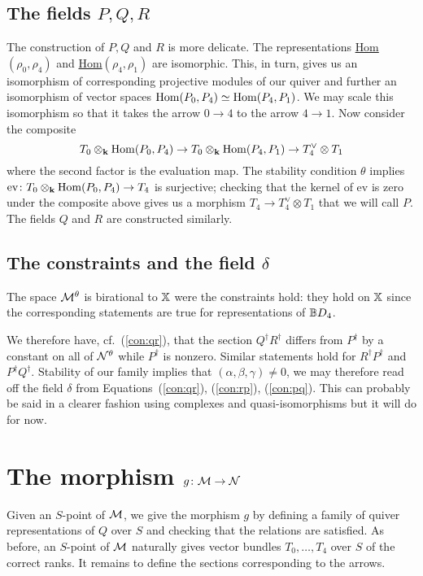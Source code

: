 \documentclass{amsart}
\theoremstyle{definition}
\begin{document}
\subsection{The fields $P, Q, R$}

The construction of $P,Q$ and $R$ is more delicate.
The representations \underline{Hom}$(\rho_0, \rho_4)$ and \underline{Hom}$(\rho_4, \rho_1)$ are isomorphic.
This, in turn, gives us an isomorphism of corresponding projective modules of our quiver and further an isomorphism of vector spaces $\operatorname{Hom}(P_0, P_4) \simeq \operatorname{Hom}(P_4, P_1)$.
We may scale this isomorphism so that it takes the arrow $0 \rightarrow 4$ to the arrow $4 \rightarrow 1$.
Now consider the composite $$T_0 \otimes_{\mathbf{k}} \operatorname{Hom}(P_0, P_4) \rightarrow T_0 \otimes_{\mathbf{k}} \operatorname{Hom}(P_4, P_1) \rightarrow T_4^\vee \otimes T_1$$ where the second factor is the evaluation map.
The stability condition $\theta$ implies $\text{ev} \colon T_0 \otimes_{\mathbf{k}} \operatorname{Hom}(P_0, P_4) \rightarrow T_4$ is surjective; checking that the kernel of ev is zero under the composite above gives us a morphism $T_4 \rightarrow T_4^\vee \otimes T_1$ that we will call $P$. 
The fields $Q$ and $R$ are constructed similarly.

\subsection{The constraints and the field $\delta$}

The space $\mathcal{M}^\theta$ is birational to $\mathbb{X}$ were the constraints hold: they hold on $\mathbb{X}$ since the corresponding statements are true for representations of $\mathbb{B} D_4$.

We therefore have, cf.\ (\ref{con:qr}), that the section $Q^\dagger R^\dagger$ differs from $P^\dagger$ by a constant on all of $\mathcal{N}^\theta$ while $P^\dagger$ is nonzero.
Similar statements hold for $R^\dagger P^\dagger$ and $P^\dagger Q^\dagger$.
Stability of our family implies that $(\alpha, \beta, \gamma) \neq 0$, we may therefore read off the field $\delta$ from Equations~(\ref{con:qr}), (\ref{con:rp}), (\ref{con:pq}). 
This can probably be said in a clearer fashion using complexes and quasi-isomorphisms but it will do for now.

\section{The morphism $g \colon \mathcal{M} \rightarrow \mathcal{N}$}

Given an $S$-point of $\mathcal{M}$, we give the morphism $g$ by defining a family of quiver representations of $Q$ over $S$ and checking that the relations are satisfied.
As before, an $S$-point of $\mathcal{M}$ naturally gives vector bundles $T_0, \ldots, T_4$ over $S$ of the correct ranks.
It remains to define the sections corresponding to the arrows.
\end{document}
